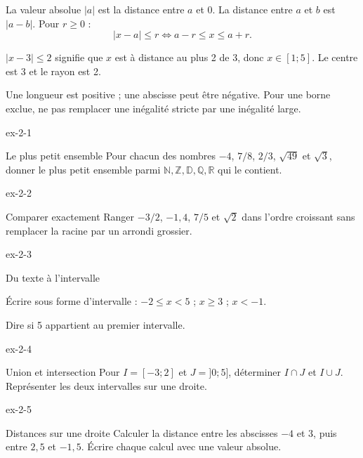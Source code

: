 \begin{definition}La valeur absolue $|a|$ est la distance entre $a$ et 0. La distance entre $a$ et $b$ est $|a-b|$. Pour $r\ge0$ :
\[|x-a|\le r\iff a-r\le x\le a+r.\]
\end{definition}
\begin{savoirfaire}
$|x-3|\le2$ signifie que $x$ est à distance au plus 2 de 3, donc $x\in[1;5]$. Le centre est 3 et le rayon est 2.
\end{savoirfaire}
\begin{attention}Une longueur est positive ; une abscisse peut être négative. Pour une borne exclue, ne pas remplacer une inégalité stricte par une inégalité large.\end{attention}
\clearpage{}
\begin{blocLivre}{ex-2-1}
\begin{exercice}[1]{Le plus petit ensemble}
Pour chacun des nombres $-4$, $7/8$, $2/3$, $\sqrt{49}$ et $\sqrt3$, donner le plus petit ensemble parmi $\mathbb N,\mathbb Z,\mathbb D,\mathbb Q,\mathbb R$ qui le contient.
\end{exercice}
\end{blocLivre}
\begin{blocLivre}{ex-2-2}
\begin{exercice}[1]{Comparer exactement}
Ranger $-3/2$, $-1{,}4$, $7/5$ et $\sqrt2$ dans l’ordre croissant sans remplacer la racine par un arrondi grossier.
\end{exercice}
\end{blocLivre}
\begin{blocLivre}{ex-2-3}
\begin{exercice}[1]{Du texte à l’intervalle}
\begin{questions}
\item Écrire sous forme d’intervalle : $-2\le x<5$ ; $x\ge3$ ; $x<-1$.
\item Dire si 5 appartient au premier intervalle.
\end{questions}
\end{exercice}
\end{blocLivre}
\begin{blocLivre}{ex-2-4}
\begin{exercice}[1]{Union et intersection}
Pour $I=[-3;2]$ et $J=]0;5]$, déterminer $I\cap J$ et $I\cup J$. Représenter les deux intervalles sur une droite.
\label{fig-ex-2-4}
\end{exercice}
\end{blocLivre}
\begin{blocLivre}{ex-2-5}
\begin{exercice}[1]{Distances sur une droite}
Calculer la distance entre les abscisses $-4$ et 3, puis entre $2{,}5$ et $-1{,}5$. Écrire chaque calcul avec une valeur absolue.
\end{exercice}
\end{blocLivre}

